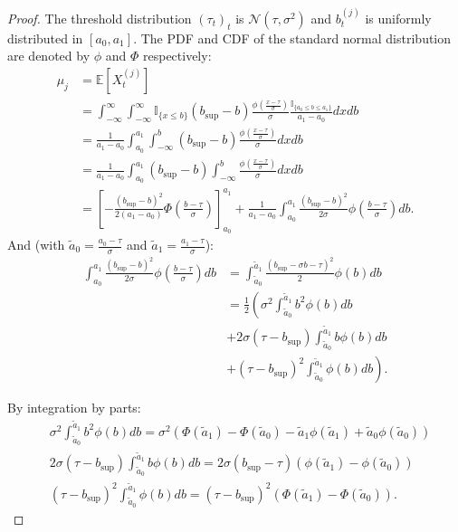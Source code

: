 \documentclass{statsmsc}
\begin{document}
\begin{proof} The threshold distribution $(\tau_t)_t$ is $\mathcal{N}(\tau, \sigma^2)$ and $b_t^{(j)}$ is uniformly distributed in $\left[ a_0, a_1\right]$.
    The PDF and CDF of the standard normal distribution are denoted by $\phi$ and $\Phi$ respectively:
\begin{align*}
    \mu_j &= \mathbb{E}[X_t^{(j)}] \\
    & = \int_{-\infty}^{\infty}\int_{-\infty}^{\infty} \mathbb{I}_{\{x \leq b\}}(b_{\sup}-b) \frac{\phi(\frac{x - \tau}{\sigma})}{\sigma}\frac{\mathbb{I}_{\{a_0 \leq b \leq a_1\}}}{a_1 - a_0} dx db \\
  & = \frac{1}{a_1 - a_0}\int_{a_0}^{a_1}\int_{-\infty}^{b} (b_{\sup}-b) \frac{\phi\left(\frac{x - \tau}{\sigma}\right)}{\sigma} dx db \\
  & = \frac{1}{a_1 - a_0}\int_{a_0}^{a_1} (b_{\sup}-b) \int_{-\infty}^{b} \frac{\phi\left(\frac{x - \tau}{\sigma}\right)}{\sigma} dx db \\
  & = \left[- \frac{(b_{\sup}-b)^2}{2 (a_1 - a_0)} \Phi\left(\frac{b - \tau}{\sigma}\right) \right]_{a_0}^{a_1} + \frac{1}{a_1 - a_0}\int_{a_0}^{a_1}  \frac{(b_{\sup}-b)^2}{2 \sigma} \phi\left(\frac{b - \tau}{\sigma}\right)db.
\end{align*}
And (with $\tilde{a}_0 = \frac{a_{0} - \tau}{\sigma} $ and $\tilde{a}_1 = \frac{a_{1} - \tau}{\sigma}$):
\begin{align*}
  \int_{a_0}^{a_1}  \frac{(b_{\sup}-b)^2}{2 \sigma} \phi\left(\frac{b - \tau}{\sigma}\right)db & = \int_{\tilde{a}_0}^{\tilde{a}_1}  \frac{(b_{\sup}- \sigma b - \tau)^2}{2} \phi\left(b\right)db \\
  & = \frac{1}{2}\left(\sigma^2\int_{\tilde{a}_0}^{\tilde{a}_1} b^2 \phi\left(b\right)db\right. \\
  & + 2 \sigma (\tau - b_{\sup})\int_{\tilde{a}_0}^{\tilde{a}_1} b \phi\left(b\right)db \\
  & + \left.(\tau - b_{\sup})^2 \int_{\tilde{a}_0}^{\tilde{a}_1} \phi\left(b\right)db \right).
\end{align*}

By integration by parts:
\begin{align*}
  &\sigma^2 \int_{\tilde{a}_0}^{\tilde{a}_1} b^2 \phi(b)db = \sigma^2 \left( \Phi\left(\tilde{a}_1\right) -  \Phi\left(\tilde{a}_0\right) - \tilde{a}_1 \phi\left(\tilde{a}_1\right) + \tilde{a}_0 \phi\left(\tilde{a}_0\right)\right)\\
  &2 \sigma (\tau - b_{\sup}) \int_{\tilde{a}_0}^{\tilde{a}_1} b \phi(b)db = 2 \sigma (b_{\sup} - \tau) \left( \phi\left(\tilde{a}_1\right) - \phi\left(\tilde{a}_0\right)\right)\\
  &(\tau - b_{\sup})^2 \int_{\tilde{a}_0}^{\tilde{a}_1} \phi(b)db = (\tau - b_{\sup})^2 \left(\Phi\left(\tilde{a}_1\right) - \Phi\left(\tilde{a}_0\right) \right).
\end{align*}


\end{proof}
\end{document}
